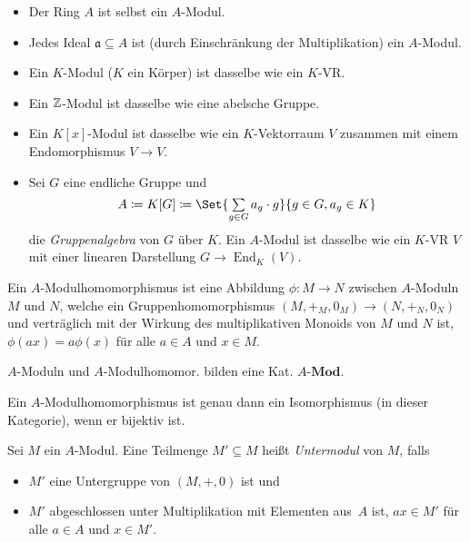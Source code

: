 \documentclass{cheat-sheet}
\newcommand{\Mod}{\mathbf{Mod}} %
\newcommand{\LMod}[1]{{#1}\text{-}\Mod} %
\DeclareMathOperator{\Hom}{Hom} %
\DeclareMathOperator{\End}{End} %
\newcommand{\aaa}{\mathfrak{a}}
\begin{document}
\begin{bspe}
  \begin{itemize}
    \item Der Ring $A$ ist selbst ein $A$-Modul.
    \item Jedes Ideal $\aaa \subseteq A$ ist (durch Einschränkung der Multiplikation) ein $A$-Modul.
    \item Ein $K$-Modul ($K$ ein Körper) ist dasselbe wie ein $K$-VR.
    \item Ein $\mathbb{Z}$-Modul ist dasselbe wie eine abelsche Gruppe.
    \item Ein $K[x]$-Modul ist dasselbe wie ein $K$-Vektorraum $V$ zusammen mit einem Endomorphismus $V \to V$.
    \item Sei $G$ eine endliche Gruppe und
    \[
      A \coloneqq K[G] \coloneqq \Set{\sum_{g \in G} a_g \cdot g}{g \in G, a_g \in K}
    \]
    die \emph{Gruppenalgebra} von $G$ über $K$.
    Ein $A$-Modul ist dasselbe wie ein $K$-VR $V$ mit einer linearen Darstellung $G \to \End_K(V)$.
  \end{itemize}
\end{bspe}

\begin{defn}
  Ein $A$-Modulhomomorphismus ist eine Abbildung $\phi : M \to N$ zwischen $A$-Moduln $M$ und $N$, welche ein Gruppenhomomorphismus $(M, +_M, 0_M) \to (N, +_N, 0_N)$ und verträglich mit der Wirkung des multiplikativen Monoids von $M$ und $N$ ist, \dh{} $\phi(ax) = a \phi(x)$ für alle $a \in A$ und $x \in M$.
\end{defn}

\begin{bem}
  $A$-Moduln und $A$-Modulhomomor. bilden eine Kat. $\LMod{A}$.
\end{bem}

\begin{lem}
  Ein $A$-Modulhomomorphismus ist genau dann ein Isomorphismus (in dieser Kategorie), wenn er bijektiv ist.
\end{lem}



\begin{defn}
  Sei $M$ ein $A$-Modul.
  Eine Teilmenge $M' \subseteq M$ heißt \emph{Untermodul} von $M$, falls
  \begin{itemize}
    \item $M'$ eine Untergruppe von $(M, +, 0)$ ist und
    \item $M'$ abgeschlossen unter Multiplikation mit Elementen aus~$A$ ist, \dh{} $a x \in M'$ für alle $a \in A$ und $x \in M'$.
  \end{itemize}
\end{defn}
\end{document}
